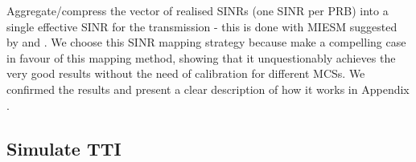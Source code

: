 Aggregate/compress the vector of realised SINRs (one SINR per PRB) into a single effective SINR for the transmission - this is done with \ac{MIESM} suggested by \cite{1696622} and \cite{1656798}. We choose this SINR mapping strategy because \cite{1656798, 4657235, 5982870, 6008103, miesm1} make a compelling case in favour of this mapping method, showing that it unquestionably achieves the very good results without the need of calibration for different MCSs. We confirmed the results and present a clear description of how it works in Appendix \cite{ap:c}. 

\subsection{Simulate TTI}

